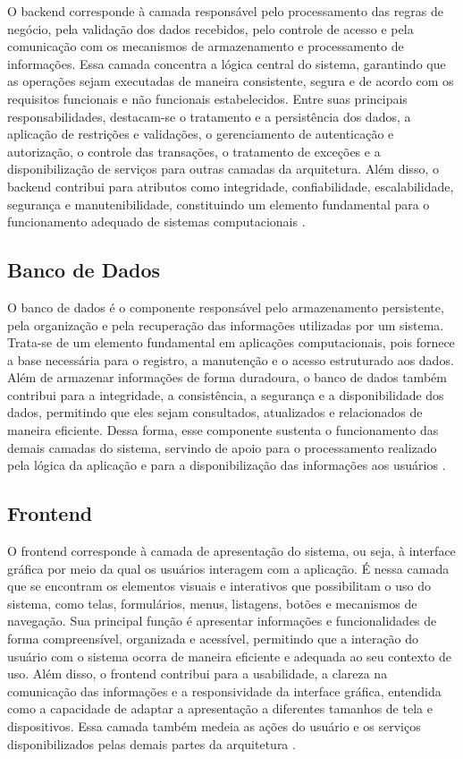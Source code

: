 O backend corresponde à camada responsável pelo processamento das regras de negócio, pela validação dos dados recebidos, pelo controle de acesso e pela comunicação com os mecanismos de armazenamento e processamento de informações. Essa camada concentra a lógica central do sistema, garantindo que as operações sejam executadas de maneira consistente, segura e de acordo com os requisitos funcionais e não funcionais estabelecidos. Entre suas principais responsabilidades, destacam-se o tratamento e a persistência dos dados, a aplicação de restrições e validações, o gerenciamento de autenticação e autorização, o controle das transações, o tratamento de exceções e a disponibilização de serviços para outras camadas da arquitetura. Além disso, o backend contribui para atributos como integridade, confiabilidade, escalabilidade, segurança e manutenibilidade, constituindo um elemento fundamental para o funcionamento adequado de sistemas computacionais \cite{sommerville2016,swebok2024,iso25010_2023}.

\subsection{Banco de Dados}

O banco de dados é o componente responsável pelo armazenamento persistente, pela organização e pela recuperação das informações utilizadas por um sistema. Trata-se de um elemento fundamental em aplicações computacionais, pois fornece a base necessária para o registro, a manutenção e o acesso estruturado aos dados. Além de armazenar informações de forma duradoura, o banco de dados também contribui para a integridade, a consistência, a segurança e a disponibilidade dos dados, permitindo que eles sejam consultados, atualizados e relacionados de maneira eficiente. Dessa forma, esse componente sustenta o funcionamento das demais camadas do sistema, servindo de apoio para o processamento realizado pela lógica da aplicação e para a disponibilização das informações aos usuários \cite{sommerville2016,swebok2024}.


\subsection{Frontend}

O frontend corresponde à camada de apresentação do sistema, ou seja, à interface gráfica por meio da qual os usuários interagem com a aplicação. É nessa camada que se encontram os elementos visuais e interativos que possibilitam o uso do sistema, como telas, formulários, menus, listagens, botões e mecanismos de navegação. Sua principal função é apresentar informações e funcionalidades de forma compreensível, organizada e acessível, permitindo que a interação do usuário com o sistema ocorra de maneira eficiente e adequada ao seu contexto de uso. Além disso, o frontend contribui para a usabilidade, a clareza na comunicação das informações e a responsividade da interface gráfica, entendida como a capacidade de adaptar a apresentação a diferentes tamanhos de tela e dispositivos. Essa camada também medeia as ações do usuário e os serviços disponibilizados pelas demais partes da arquitetura \cite{sommerville2016,swebok2024,iso25010_2023}.

